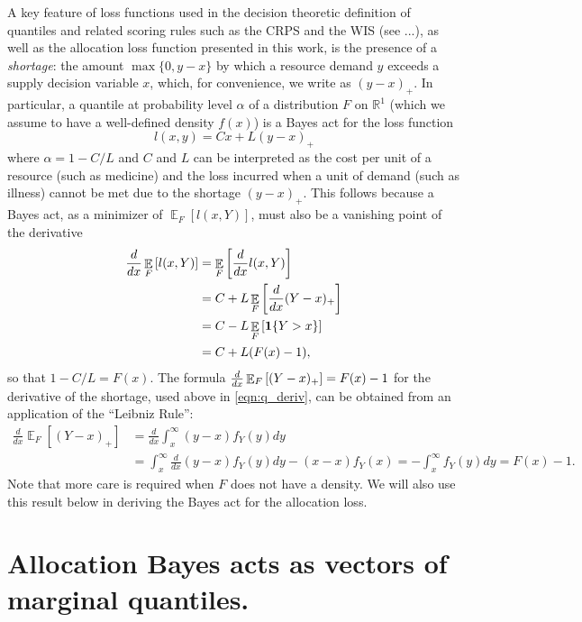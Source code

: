 \documentclass{article}
\DeclareMathOperator{\Ex}{\mathbb{E}}
\begin{document}
A key feature of loss functions used in the decision theoretic definition of quantiles and related scoring rules such as the 
CRPS and the WIS (see ...), as well as the allocation loss function presented in this work, is the presence of a \emph{shortage}: 
the amount $\max\{0,y-x\}$ by which a resource demand 
$y$ exceeds a supply decision variable $x$, which, for convenience, we write as $(y-x)_{+}$. In particular, a quantile at 
probability level $\alpha$ of a distribution $F$ on $\mathbb{R}^1$ (which we assume to have a well-defined density $f(x)$) 
is a Bayes act for the loss function
\[
l(x,y) = Cx + L(y-x)_{+}
\] 
where $\alpha = 1-C/L$ and $C$ and $L$ can be interpreted as the cost per unit of a resource (such as medicine) and the loss
incurred when a unit of demand (such as illness) cannot be met due to the shortage $(y-x)_{+}$.  This follows because a 
Bayes act, as a minimizer of $\Ex_F[l(x,Y)]$, must also be a vanishing point of the derivative
\begin{align}
\dby{}{x} \Ex_F\left[l(x,Y)\right] &= \Ex_F\left[\dby{}{x}l(x,Y)\right] \nonumber\\
&= C + L\Ex_F\left[\dby{}{x}(Y-x)_+\right] \nonumber\\
&= C - L\Ex_F\left[\mathbf{1}\{Y > x\}\right] \nonumber\\
&= C + L(F(x) - 1), \label{eqn:q_deriv}
\end{align}
so that $1-C/L = F(x)$.
The formula $\dby{}{x}\Ex_F\left[(Y-x)_+\right] = F(x) - 1$ for the derivative of the shortage,
used above in \eqref{eqn:q_deriv}, can be obtained from an application of the ``Leibniz Rule'':
\begin{align}
	\frac{d}{dx} \Ex_F [(Y-x)_{+}] &= \frac{d}{dx} \int_{x}^{\infty} (y-x) f_Y(y)dy \nonumber\\
	&= \int_{x}^{\infty} \frac{d}{dx}(y-x) f_Y(y)dy - (x-x) f_Y(x) = -\int_{x}^{\infty} f_Y(y)dy = F(x)-1. \label{eqn:shortage_deriv}
\end{align}
Note that more care is required when $F$ does not have a density.
We will also use this result below in deriving the Bayes act for the allocation loss.

\section{Allocation Bayes acts as vectors of marginal quantiles.}
\label{sec:bayes-quantiles}
\end{document}
